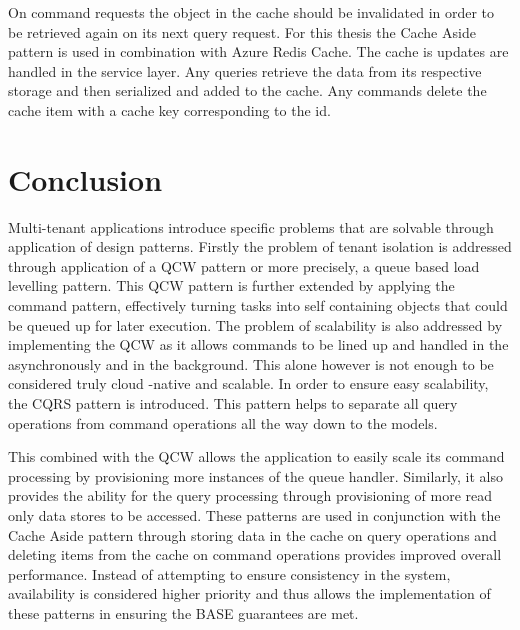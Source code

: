  
On command requests the object in the cache should be invalidated in order to be retrieved again on its next query request. For this thesis the Cache Aside pattern is used in combination with Azure Redis Cache. The cache is updates are handled in the service layer. Any queries retrieve the data from its respective storage and then serialized and added to the cache. Any commands delete the cache item with a cache key corresponding to the id.


\section{Conclusion}
 
Multi-tenant applications introduce specific problems that are solvable through application of design patterns. Firstly the problem of tenant isolation is addressed through application of a QCW pattern or more precisely, a queue based load levelling pattern. This QCW pattern is further extended by applying the command pattern, effectively turning tasks into self containing objects that could be queued up for later execution. The problem of scalability is also addressed by implementing the QCW as it allows commands to be lined up and handled in the asynchronously and in the background. This alone however is not enough to be considered truly cloud -native and scalable. In order to ensure easy scalability, the CQRS pattern is introduced. This pattern helps to separate all query operations from command operations all the way down to the models.
 
This combined with the QCW allows the application to easily scale its command processing by provisioning more instances of the queue handler. Similarly, it also provides the ability for the query processing through provisioning of more read only data stores to be accessed. These patterns are used in conjunction with the Cache Aside pattern through storing data in the cache on query operations and deleting items from the cache on command operations provides improved overall performance. Instead of attempting to ensure consistency in the system, availability is considered higher priority and thus allows the implementation of these patterns in ensuring the BASE guarantees are met.
